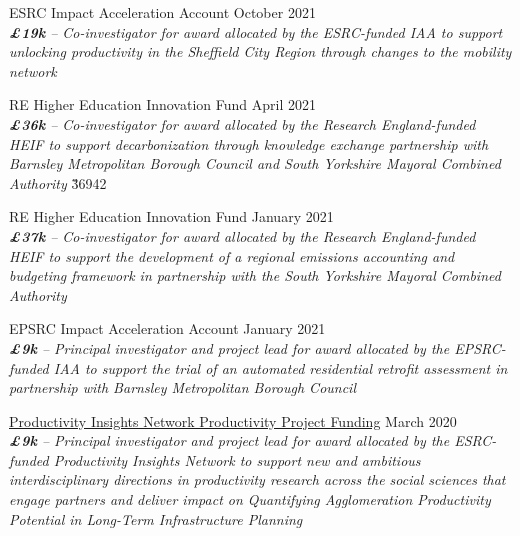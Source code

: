 \documentclass[10pt]{article}
\newcommand{\blankline}{\quad\pagebreak[3]}
\begin{document}
\blankline

ESRC Impact Acceleration Account \hfill {October 2021}\\
\emph{\textbf{\pounds19k} -- Co-investigator for award allocated by the ESRC-funded IAA to support unlocking productivity in the Sheffield City Region through changes to the mobility network}
\FPset{}
\FPset{}

\blankline

RE Higher Education Innovation Fund \hfill {April 2021}\\
\emph{\textbf{\pounds36k} -- Co-investigator for award allocated by the Research England-funded HEIF to support decarbonization through knowledge exchange partnership with Barnsley Metropolitan Borough Council and South Yorkshire Mayoral Combined Authority}
\FPset\v{36942}
\FPset{}

\blankline

RE Higher Education Innovation Fund \hfill {January 2021}\\
\emph{\textbf{\pounds37k} -- Co-investigator for award allocated by the Research England-funded HEIF to support the development of a regional emissions accounting and budgeting framework in partnership with the South Yorkshire Mayoral Combined Authority}
\FPset{}
\FPset{}

\blankline

EPSRC Impact Acceleration Account \hfill {January 2021}\\
\emph{\textbf{\pounds9k} -- Principal investigator and project lead for award allocated by the EPSRC-funded IAA to support the trial of an automated residential retrofit assessment in partnership with Barnsley Metropolitan Borough Council}
\FPset{}
\FPset{}

\blankline

\href{https://productivityinsightsnetwork.co.uk/projects/}{Productivity Insights Network Productivity Project Funding} \hfill {March 2020}\\
\emph{\textbf{\pounds9k} -- Principal investigator and project lead for award allocated by the ESRC-funded Productivity Insights Network to support new and ambitious interdisciplinary directions in productivity research across the social sciences that engage partners and deliver impact on Quantifying Agglomeration Productivity Potential in Long-Term Infrastructure Planning} %
\FPset{}
\FPset{}

\blankline
\end{document}
